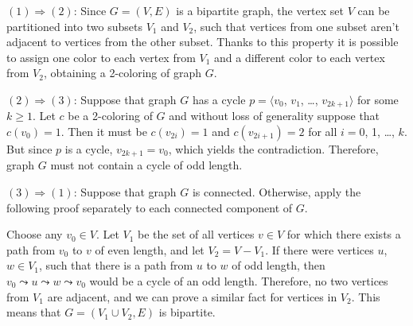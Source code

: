 \subproblem
$(1)\Rightarrow(2)$: Since $G=(V,E)$ is a bipartite graph, the vertex set $V$ can be partitioned into two subsets $V_1$ and $V_2$, such that vertices from one subset aren't adjacent to vertices from the other subset.
Thanks to this property it is possible to assign one color to each vertex from $V_1$ and a different color to each vertex from $V_2$, obtaining a 2-coloring of graph $G$.

$(2)\Rightarrow(3)$: Suppose that graph $G$ has a cycle $p=\langle v_0$, $v_1$, \dots, $v_{2k+1}\rangle$ for some $k\ge1$.
Let $c$ be a 2-coloring of $G$ and without loss of generality suppose that $c(v_0)=1$.
Then it must be $c(v_{2i})=1$ and $c(v_{2i+1})=2$ for all $i=0$, 1, \dots, $k$.
But since $p$ is a cycle, $v_{2k+1}=v_0$, which yields the contradiction.
Therefore, graph $G$ must not contain a cycle of odd length.

$(3)\Rightarrow(1)$: Suppose that graph $G$ is connected.
Otherwise, apply the following proof separately to each connected component of $G$.

Choose any $v_0\in V$.
Let $V_1$ be the set of all vertices $v\in V$ for which there exists a path from $v_0$ to $v$ of even length, and let $V_2=V-V_1$.
If there were vertices $u$, $w\in V_1$, such that there is a path from $u$ to $w$ of odd length, then $v_0\leadsto u\leadsto w\leadsto v_0$ would be a cycle of an odd length.
Therefore, no two vertices from $V_1$ are adjacent, and we can prove a similar fact for vertices in $V_2$.
This means that $G=(V_1\cup V_2,E)$ is bipartite.
